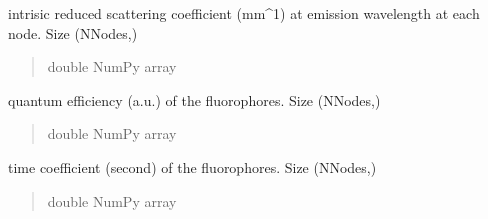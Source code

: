 \documentclass[letterpaper,10pt,english]{sphinxmanual}
\begin{document}
\begin{fulllineitems}
\begin{fulllineitems}
\begin{quote}
\begin{description}
\end{description}\end{quote}

\end{fulllineitems}


\begin{fulllineitems}
\label{\detokenize{_autosummary/nirfasterff.base.fluor_mesh.fluormesh:nirfasterff.base.fluor_mesh.fluormesh.musm}}
\pysigstartsignatures
{}
\pysigstopsignatures
\sphinxAtStartPar
intrisic reduced scattering coefficient (mm\textasciicircum{}\sphinxhyphen{}1) at emission wavelength at each node. Size (NNodes,)
\begin{quote}\begin{description}
\sphinxAtStartPar
double NumPy array

\end{description}\end{quote}

\end{fulllineitems}


\begin{fulllineitems}
\label{\detokenize{_autosummary/nirfasterff.base.fluor_mesh.fluormesh:nirfasterff.base.fluor_mesh.fluormesh.eta}}
\pysigstartsignatures
{}
\pysigstopsignatures
\sphinxAtStartPar
quantum efficiency (a.u.) of the fluorophores. Size (NNodes,)
\begin{quote}\begin{description}
\sphinxAtStartPar
double NumPy array

\end{description}\end{quote}

\end{fulllineitems}


\begin{fulllineitems}
\label{\detokenize{_autosummary/nirfasterff.base.fluor_mesh.fluormesh:nirfasterff.base.fluor_mesh.fluormesh.tau}}
\pysigstartsignatures
{}
\pysigstopsignatures
\sphinxAtStartPar
time coefficient (second) of the fluorophores. Size (NNodes,)
\begin{quote}\begin{description}
\sphinxAtStartPar
double NumPy array


\end{description}
\end{quote}
\end{fulllineitems}
\end{fulllineitems}
\end{document}
